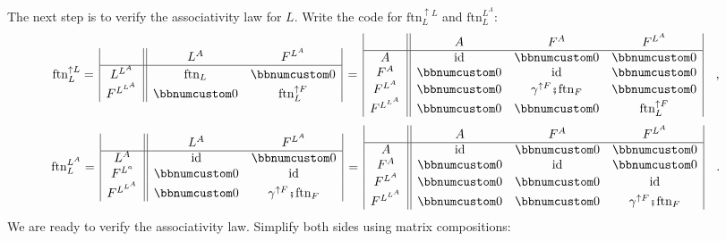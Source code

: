 The next step is to verify the associativity law for $L$. Write the
code for $\text{ftn}_{L}^{\uparrow L}$ and $\text{ftn}_{L}^{L^{A}}$:
\begin{align*}
 & \text{ftn}_{L}^{\uparrow L}=\,\begin{array}{|c||cc|}
 & L^{A} & F^{L^{A}}\\
\hline L^{L^{A}} & \text{ftn}_{L} & \bbnum 0\\
F^{L^{L^{A}}} & \bbnum 0 & \text{ftn}_{L}^{\uparrow F}
\end{array}\,=\,\begin{array}{|c||ccc|}
 & A & F^{A} & F^{L^{A}}\\
\hline A & \text{id} & \bbnum 0 & \bbnum 0\\
F^{A} & \bbnum 0 & \text{id} & \bbnum 0\\
F^{L^{A}} & \bbnum 0 & \gamma^{\uparrow F}\bef\text{ftn}_{F} & \bbnum 0\\
F^{L^{L^{A}}} & \bbnum 0 & \bbnum 0 & \text{ftn}_{L}^{\uparrow F}
\end{array}\quad,
\end{align*}
\begin{align*}
 & \text{ftn}_{L}^{L^{A}}=\,\begin{array}{|c||cc|}
 & L^{A} & F^{L^{A}}\\
\hline L^{A} & \text{id} & \bbnum 0\\
F^{L^{a}} & \bbnum 0 & \text{id}\\
F^{L^{L^{A}}} & \bbnum 0 & \gamma^{\uparrow F}\bef\text{ftn}_{F}
\end{array}\,=\,\begin{array}{|c||ccc|}
 & A & F^{A} & F^{L^{A}}\\
\hline A & \text{id} & \bbnum 0 & \bbnum 0\\
F^{A} & \bbnum 0 & \text{id} & \bbnum 0\\
F^{L^{A}} & \bbnum 0 & \bbnum 0 & \text{id}\\
F^{L^{L^{A}}} & \bbnum 0 & \bbnum 0 & \gamma^{\uparrow F}\bef\text{ftn}_{F}
\end{array}\quad.
\end{align*}
We are ready to verify the associativity law. Simplify both sides
using matrix compositions:
